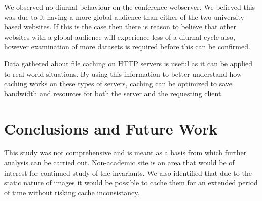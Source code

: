 \documentclass[10pt,conference]{IEEEtran}
\begin{document}
We observed no diurnal behaviour on the conference webserver. We believed this was due to it having a more global audience than either of the two university based websites. If this is the case then there is reason to believe that other websites with a global audience will experience less of a diurnal cycle also, however examination of more datasets is required before this can be confirmed.

Data gathered about file caching on HTTP servers is useful as it can be applied to real world situations. By using this information to better understand how caching works on these types of servers, caching can be optimized to save bandwidth and resources for both the server and the requesting client.

\section{Conclusions and Future Work}\label{conclusions}
This study was not comprehensive and is meant as a basis from which further analysis can be carried out. Non-academic site is an area that would be of interest for continued study of the invariants.
We also identified that due to the static nature of images it would be possible to cache them for an extended period of time without risking cache inconsistancy.

\printbibliography
\end{document}

